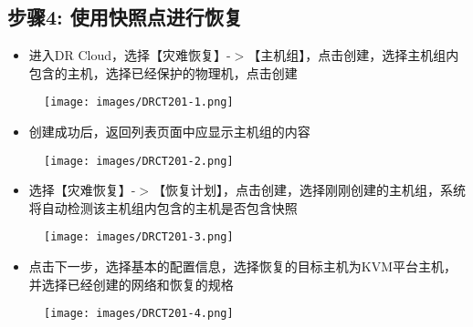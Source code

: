 \subsection{步骤4: 使用快照点进行恢复}
\label{步骤4:使用快照点进行恢复}

\begin{itemize}
\item 进入DR Cloud，选择【灾难恢复】-$>$【主机组】，点击创建，选择主机组内包含的主机，选择已经保护的物理机，点击创建

\end{itemize}

\begin{figure}[htbp]
\centering
\texttt{[image: images/DRCT201-1.png]}
\end{figure}

\begin{itemize}
\item 创建成功后，返回列表页面中应显示主机组的内容

\end{itemize}

\begin{figure}[htbp]
\centering
\texttt{[image: images/DRCT201-2.png]}
\end{figure}

\begin{itemize}
\item 选择【灾难恢复】-$>$【恢复计划】，点击创建，选择刚刚创建的主机组，系统将自动检测该主机组内包含的主机是否包含快照

\end{itemize}

\begin{figure}[htbp]
\centering
\texttt{[image: images/DRCT201-3.png]}
\end{figure}

\begin{itemize}
\item 点击下一步，选择基本的配置信息，选择恢复的目标主机为KVM平台主机，并选择已经创建的网络和恢复的规格

\end{itemize}

\begin{figure}[htbp]
\centering
\texttt{[image: images/DRCT201-4.png]}
\end{figure}

